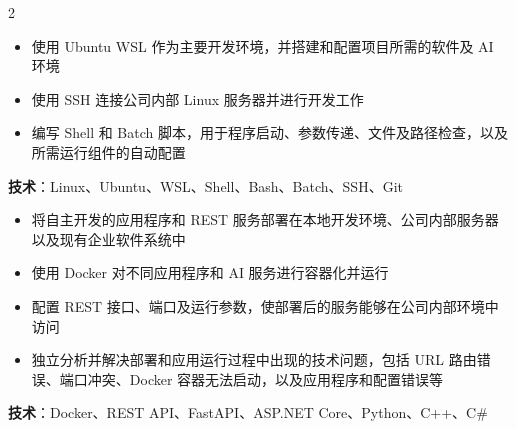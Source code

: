 \documentclass[10pt,a4paper,withhyper]{../altacv}
\begin{document}
\begin{paracol}{2}
  \switchcolumn


  \vspace{1em}


  \vspace{1.0em}

  \begin{itemize}
    \item 使用 Ubuntu WSL 作为主要开发环境，并搭建和配置项目所需的软件及 AI 环境
    \item 使用 SSH 连接公司内部 Linux 服务器并进行开发工作
    \item 编写 Shell 和 Batch 脚本，用于程序启动、参数传递、文件及路径检查，以及所需运行组件的自动配置
  \end{itemize}

  \vspace{1.0em}

  \textbf{技术}：Linux、Ubuntu、WSL、Shell、Bash、Batch、SSH、Git

  \vspace{1.5em}


  \vspace{1.0em}

  \begin{itemize}
    \item 将自主开发的应用程序和 REST 服务部署在本地开发环境、公司内部服务器以及现有企业软件系统中
    \item 使用 Docker 对不同应用程序和 AI 服务进行容器化并运行
    \item 配置 REST 接口、端口及运行参数，使部署后的服务能够在公司内部环境中访问
    \item 独立分析并解决部署和应用运行过程中出现的技术问题，包括 URL 路由错误、端口冲突、Docker 容器无法启动，以及应用程序和配置错误等
  \end{itemize}

  \vspace{1.0em}

  \textbf{技术}：Docker、REST API、FastAPI、ASP.NET Core、Python、C++、C\#

  \vspace{1.5em}


\end{paracol}
\end{document}
